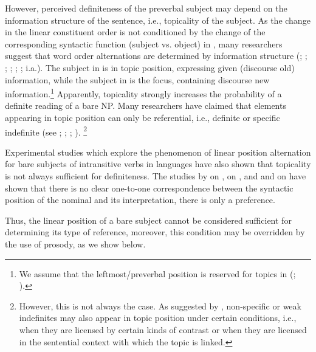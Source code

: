 \documentclass[output=paper,
colorlinks,
citecolor=brown,
newtxmath
]{langscibook}
\begin{document}
    \largerpage[-2] %

However, perceived definiteness of the preverbal subject may depend on the information structure of the sentence, i.e., topicality of the subject. As the change in the linear constituent order is not conditioned by the change of the corresponding syntactic function (subject vs. object) in , many researchers suggest that word order alternations are determined by information structure (\citealt{Mathesius1964}; \citealt{Sgall1972}; \citealt{Hajicova1974}; \citealt{Isacenko1976}; \citealt{Yokoyama1987}; \citealt{Comrie1981}; i.a.). The subject in  is in topic position,  expressing given (discourse old) information, while the subject in  is the focus, containing discourse new information.\footnote{We assume that the leftmost/preverbal position is reserved for topics in  (\citealt{Geist2010}; \citealt{Jasinskaja2016}).} Apparently, topicality strongly increases the probability of a definite reading of a bare NP. Many researchers have claimed that elements appearing in topic position can only be referential, i.e., definite or specific indefinite (see \citealt{Reinhart1981}; \citealt{Erteschik-Shir1998}; \citealt{Portner.Yabushita2001}; \citealt{Endriss2009}).%
\footnote{However, this is not always the case. As suggested by \citet{Leonetti2010}, non-specific or weak indefinites may also appear in topic position under certain conditions, i.e., when they are licensed by certain kinds of contrast %
or when they are licensed in the sentential context with which the topic is linked.}

Experimental studies which explore the phenomenon of linear position alternation for bare subjects of intransitive verbs in  languages have also shown that topicality is not always sufficient for definiteness. The studies by \citet{Simik2014} on , \citet{Czardybon.etal2014} on , and \citet{Borik.etal2019} and \citet{Seres.etal2019} on  have shown that there is no clear one-to-one correspondence between the syntactic position of the nominal and its interpretation, there is only a preference.

Thus, the linear position of a bare subject %
cannot be considered sufficient for determining its type of reference, moreover, this condition may be overridden by the use of prosody, as we show below.
\end{document}

